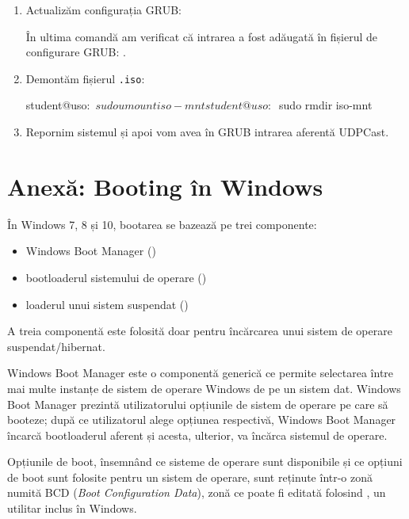 \begin{enumerate}
	\item Actualizăm configurația GRUB:

\begin{screen}
student@uso:~$ sudo update-grub
Generating grub configuration file ...
[...]
done
student@uso:~$ grep UDPCast /boot/grub/grub.cfg
menuentry 'UDPCast' {
\end{screen}

În ultima comandă am verificat că intrarea a fost adăugată în fișierul de configurare GRUB: .

        \item Demontăm fișierul \texttt{.iso}:

\begin{screen}
student@uso:~$ sudo umount iso-mnt
student@uso:~$ sudo rmdir iso-mnt
\end{screen}

	\item Repornim sistemul și apoi vom avea în GRUB intrarea aferentă UDPCast.
\end{enumerate}

\section{Anexă: Booting în Windows}
\label{sec:boot-init-win}

În Windows 7, 8 și 10, bootarea se bazează pe trei componente:

\begin{itemize}
  \item Windows Boot Manager ()
  \item bootloaderul sistemului de operare ()
  \item loaderul unui sistem suspendat ()
\end{itemize}

A treia componentă este folosită doar pentru încărcarea unui sistem de operare suspendat/hibernat.

Windows Boot Manager este o componentă generică ce permite selectarea între mai
multe instanțe de sistem de operare Windows de pe un sistem dat. Windows Boot
Manager prezintă utilizatorului opțiunile de sistem de operare pe care să
booteze; după ce utilizatorul alege opțiunea respectivă, Windows Boot Manager
încarcă bootloaderul aferent și acesta, ulterior, va încărca sistemul de
operare.

Opțiunile de boot, însemnând ce sisteme de operare sunt disponibile și ce
opțiuni de boot sunt folosite pentru un sistem de operare, sunt reținute într-o
zonă numită BCD  (\textit{Boot Configuration Data}),
zonă ce poate fi editată folosind , un utilitar inclus în Windows.

